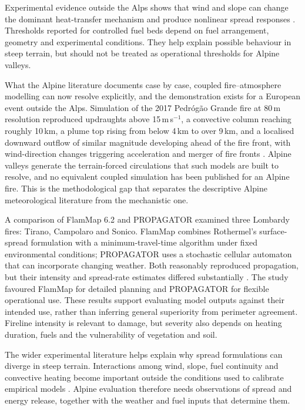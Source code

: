 \documentclass[11pt,a4paper]{article}
\begin{document}
Experimental evidence outside the Alps shows that wind and slope can change the dominant heat-transfer mechanism and produce nonlinear spread responses \citep{hayajneh_wind_2026}. Thresholds reported for controlled fuel beds depend on fuel arrangement, geometry and experimental conditions. They help explain possible behaviour in steep terrain, but should not be treated as operational thresholds for Alpine valleys.

What the Alpine literature documents case by case, coupled fire--atmosphere modelling can now resolve explicitly, and the demonstration exists for a European event outside the Alps. Simulation of the 2017 Pedr\'og\~ao Grande fire at 80\,m resolution reproduced updraughts above 15\,m\,s$^{-1}$, a convective column reaching roughly 10\,km, a plume top rising from below 4\,km to over 9\,km, and a localised downward outflow of similar magnitude developing ahead of the fire front, with wind-direction changes triggering acceleration and merger of fire fronts \citep{couto_numerical_2024}. Alpine valleys generate the terrain-forced circulations that such models are built to resolve, and no equivalent coupled simulation has been published for an Alpine fire. This is the methodological gap that separates the descriptive Alpine meteorological literature from the mechanistic one.

A comparison of FlamMap 6.2 and PROPAGATOR examined three Lombardy fires: Tirano, Campolaro and Sonico. FlamMap combines Rothermel's surface-spread formulation with a minimum-travel-time algorithm under fixed environmental conditions; PROPAGATOR uses a stochastic cellular automaton that can incorporate changing weather. Both reasonably reproduced propagation, but their intensity and spread-rate estimates differed substantially \citep{malanchini_modeling_2025}. The study favoured FlamMap for detailed planning and PROPAGATOR for flexible operational use. These results support evaluating model outputs against their intended use, rather than inferring general superiority from perimeter agreement. Fireline intensity is relevant to damage, but severity also depends on heating duration, fuels and the vulnerability of vegetation and soil.

The wider experimental literature helps explain why spread formulations can diverge in steep terrain. Interactions among wind, slope, fuel continuity and convective heating become important outside the conditions used to calibrate empirical models \citep{hayajneh_wind_2026}. Alpine evaluation therefore needs observations of spread and energy release, together with the weather and fuel inputs that determine them.
\end{document}
